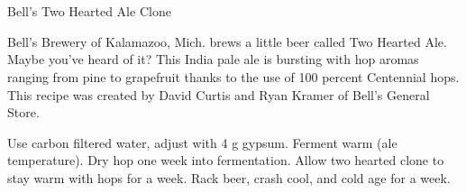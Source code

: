 \part{\styleamericanipa}

\begin{recipie}{Bell's Two Hearted Ale Clone}

\begin{aboutblock}
Bell's Brewery of Kalamazoo, Mich. brews a little beer called Two Hearted Ale. Maybe you've
heard of it? This India pale ale is bursting with hop aromas ranging from pine to grapefruit
thanks to the use of 100 percent Centennial hops. This recipe was created by David Curtis and
Ryan Kramer of Bell's General Store.
\end{aboutblock}


\begin{methodandtiming}
 
\begin{mashsteps}
\end{mashsteps}

\begin{directions}
Use carbon filtered water, adjust with 4 g gypsum. Ferment warm (ale temperature).
Dry hop one week into fermentation. Allow two hearted clone to stay warm with hops for a week.
Rack beer, crash cool, and cold age for a week.
\end{directions}

\end{methodandtiming}

\pagebreak

\begin{ingredientsblock}

\begin{malts}
\end{malts}

\begin{hops}
\end{hops}

\begin{yeasts}
\end{yeasts}

\end{ingredientsblock}

\end{recipie}

